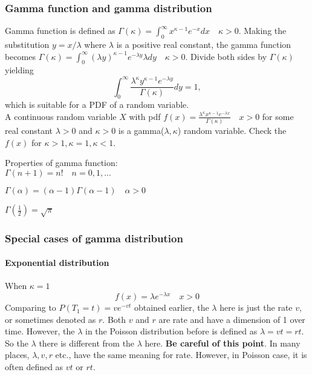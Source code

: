 \documentclass[11pt]{article}
\begin{document}
    \subsubsection{Gamma function and gamma
distribution}\label{gamma-function-and-gamma-distribution}

Gamma function is defined as
\(\Gamma(\kappa) = \int_0^{\infty}x^{\kappa - 1}e^{-x}dx \quad \kappa > 0\).
Making the substitution \(y = x/\lambda\) where \(\lambda\) is a
positive real constant, the gamma function becomes
\(\Gamma(\kappa) = \int_0^{\infty}(\lambda y)^{\kappa - 1}e^{-\lambda y}\lambda dy \quad \kappa > 0\).
Divide both sides by \(\Gamma(\kappa)\) yielding
\[ \int_0^{\infty} \frac{\lambda^{\kappa}y^{\kappa-1}e^{-\lambda y}}{\Gamma(\kappa)} dy = 1,\]
which is suitable for a PDF of a random variable.\\
A continuous random variable \(X\) with pdf
\(f(x) = \frac{\lambda^{\kappa}x^{\kappa-1}e^{-\lambda x}}{\Gamma(\kappa)} \quad x > 0\)
for some real constant \(\lambda > 0\) and \(\kappa > 0\) is a
gamma(\(\lambda,\kappa\)) random variable. Check the \(f(x)\) for
\(\kappa > 1, \kappa = 1, \kappa < 1\).

Properties of gamma function:\\
\(\Gamma(n+1) = n! \quad n = 0, 1, ...\)

\(\Gamma(\alpha) = (\alpha-1)\Gamma(\alpha-1) \quad \alpha > 0\)

\(\Gamma(\frac{1}{2}) = \sqrt{\pi}\)

    \subsubsection{Special cases of gamma
distribution}\label{special-cases-of-gamma-distribution}

\paragraph{Exponential distribution}\label{exponential-distribution}

When \(\kappa = 1\)\\
\[ f(x) = \lambda e^{-\lambda x} \quad x>0\] Comparing to
\(P(T_1 = t) = ve^{-vt}\) obtained earlier, the \(\lambda\) here is just
the rate \(v\), or sometimes denoted as \(r\). Both \(v\) and \(r\) are
rate and have a dimension of 1 over time. However, the \(\lambda\) in
the Poisson distribution before is defined as \(\lambda = vt = rt\). So
the \(\lambda\) there is different from the \(\lambda\) here. \textbf{Be
careful of this point}. In many places, \(\lambda, v, r\) etc., have the
same meaning for rate. However, in Poisson case, it is often defined as
\(vt\) or \(rt\).
\end{document}
